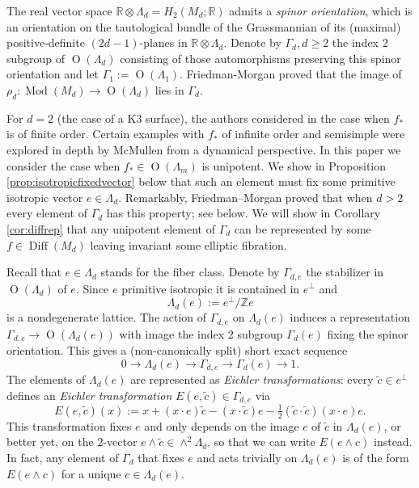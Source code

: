 \documentclass[10pt,letterpaper]{amsart}
\numberwithin{equation}{section}
\def\RR{{\mathbb R}}
\def\ZZ{{\mathbb Z}}
\newcommand\Diff{\operatorname{Diff}}
\newcommand\Mod{\operatorname{Mod}}
\newcommand\Orth{\operatorname{O}}
\theoremstyle{remark}
\begin{document}
The real vector space $\RR\otimes \Lambda_d=H_2(M_d; \RR)$ admits a {\em spinor orientation}, which is an orientation on the tautological bundle of the Grassmannian of its (maximal) positive-definite $(2d-1)$-planes in $\RR\otimes \Lambda_d$.  Denote by $\Gamma_d, d\geq 2$ the index $2$ subgroup of $\Orth(\Lambda_d)$ consisting of those automorphisms preserving this spinor orientation and let $\Gamma_1:=\Orth(\Lambda_1)$.  Friedman-Morgan \cite{FM2} proved that the image of $\rho_d:\Mod(M_d)\to \Orth(\Lambda_d)$ lies in $\Gamma_d$.  

For $d=2$ (the case of a K3 surface), the authors  considered in \cite{FL1} the case when $f_*$ is of finite order.  Certain examples with $f_*$ of  infinite order and semisimple were explored in depth by McMullen \cite{Mc} from a 
dynamical perspective.  In this paper we consider the case when $f_*\in\Orth(\Lambda_m)$ is unipotent.   We show in Proposition \ref{prop:isotropicfixedvector} below that such an element must fix some primitive isotropic vector $e\in \Lambda_d$.  Remarkably, Friedman--Morgan  proved \cite{FM2} that when $d>2$  every element of $\Gamma_d$ has this 
property; see below.  We will show in Corollary \ref{cor:diffrep} that 
any unipotent element of $\Gamma_d$ can be represented by some $f\in\Diff(M_d)$ leaving invariant some elliptic fibration.  

Recall that $e\in \Lambda_d$ stands for the fiber class. Denote by $\Gamma_{d,e}$ the stabilizer in $\Orth(\Lambda_d)$ of $e$. Since $e$ primitive isotropic it is contained in $e^\perp$ and 
\[
\Lambda_d(e):= e^\perp/\ZZ e
\]
is a nondegenerate lattice.
The action of $\Gamma_{d,e}$  on $\Lambda_d(e)$ induces a representation $\Gamma_{d,e}\to\Orth(\Lambda_d(e))$ with image the index $2$ subgroup $\Gamma_d(e)$ fixing the spinor orientation.  This gives a (non-canonically split) short exact sequence
\[
0\to \Lambda_d(e)\to \Gamma_{d,e} \to \Gamma_d(e)\to 1.
\]
The elements of $\Lambda_d(e)$ are represented as \emph{Eichler transformations}:  every  $\tilde c\in e^\perp$ 
 defines an \emph{Eichler transformation} $E(e,\tilde c)\in \Gamma_{d,e}$ via
\[
E(e,\tilde c)(x):=x + (x\cdot e)\tilde c- (x\cdot \tilde c)e-\tfrac{1}{2}(\tilde c\cdot \tilde c)(x\cdot e)e.
\]
This transformation fixes $e$ and only depends on the image $c$ of $\tilde c$ in $\Lambda_d(e)$,  or better yet, on the $2$-vector $e\wedge \tilde c\in \wedge^2\Lambda_d$, so that we can write $E(e\wedge c)$ instead. In fact, 
any element of $\Gamma_d$ that fixes $e$ and acts trivially on $\Lambda_d(e)$ is of the form $E(e\wedge c)$ for a unique $c\in \Lambda_d(e)$.  
\end{document}
